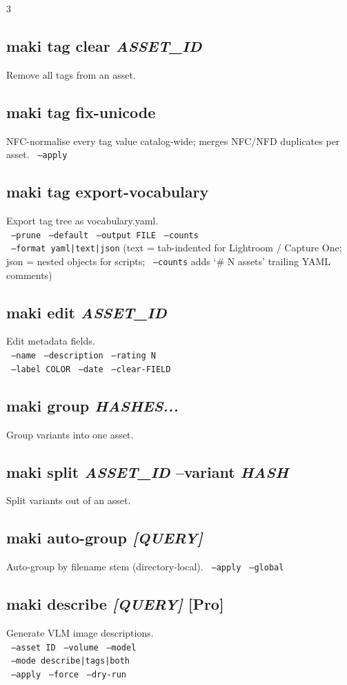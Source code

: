 \documentclass[a4paper,landscape,8pt]{article}
\newcommand{\opt}[1]{\texttt{\scriptsize\color{maki-stone} #1}}
\newcommand{\pro}{\textcolor{maki-teal}{\scriptsize [Pro]}}
\begin{document}
\begin{multicols}{3}
\subsection{maki tag clear \textit{ASSET\_ID}}
Remove all tags from an asset.

\subsection{maki tag fix-unicode}
NFC-normalise every tag value catalog-wide; merges NFC/NFD duplicates per asset. \opt{--apply}

\subsection{maki tag export-vocabulary}
Export tag tree as vocabulary.yaml. \\
\opt{--prune} \opt{--default} \opt{--output FILE} \opt{--counts} \\
\opt{--format yaml|text|json} (text = tab-indented for Lightroom / Capture One; json = nested objects for scripts; \opt{--counts} adds `\# N assets' trailing YAML comments)

\subsection{maki edit \textit{ASSET\_ID}}
Edit metadata fields. \\
\opt{--name} \opt{--description} \opt{--rating N} \\
\opt{--label COLOR} \opt{--date} \opt{--clear-FIELD}

\subsection{maki group \textit{HASHES...}}
Group variants into one asset.

\subsection{maki split \textit{ASSET\_ID} --variant \textit{HASH}}
Split variants out of an asset.

\subsection{maki auto-group \textit{[QUERY]}}
Auto-group by filename stem (directory-local). \opt{--apply} \opt{--global}

\subsection{maki describe \textit{[QUERY]} \pro}
Generate VLM image descriptions. \\
\opt{--asset ID} \opt{--volume} \opt{--model} \\
\opt{--mode describe|tags|both} \\
\opt{--apply} \opt{--force} \opt{--dry-run}


\end{multicols}
\end{document}
